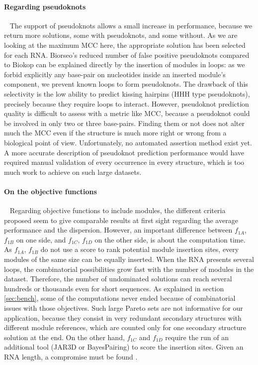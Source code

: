 \documentclass{bioinfo}
\begin{document}
\paragraph{Regarding pseudoknots} ~ The support of pseudoknots allows a small increase in performance, because we return more solutions, some with pseudoknots, and some without. As we are looking at the maximum MCC here, the appropriate solution has been selected for each RNA. 
Biorseo's reduced number of false positive pseudoknots compared to Biokop can be explained directly by the insertion of modules in loops: as we forbid explicitly any base-pair on nucleotides inside an inserted module's component, we prevent known loops to form pseudoknots. The drawback of this selectivity is the low ability to predict kissing hairpins (HHH type pseudoknots), precisely because they require loops to interact.
However, pseudoknot prediction quality is difficult to assess with a metric like MCC, because a pseudoknot could be involved in only two or three base-pairs. Finding them or not does not alter much the MCC even if the structure is much more right or wrong from a biological point of view. Unfortunately, no automated assertion method exist yet.  A more accurate description of pseudoknot prediction performance would have required manual validation of every occurrence in every structure, which is too much work to achieve on such large datasets.

\paragraph{On the objective functions} ~ 
Regarding objective functions to include modules, the different criteria proposed seem to give comparable results at first sight regarding the average performance and the dispersion. However, an important difference between $f_{1A}$, $f_{1B}$ on one side, and $f_{1C}$, $f_{1D}$ on the other side, is about the computation time. As $f_{1A}$, $f_{1B}$ do not use a score to rank potential module insertion sites, every modules of the same size can be equally inserted. When the RNA presents several loops, the combinatorial possibilities grow fast with the number of modules in the dataset. Therefore, the number of undominated solutions can reach several hundreds or thousands even for short sequences. As explained in section \ref{sec:bench}, some of the computations never ended because of combinatorial issues with those objectives. Such large Pareto sets are not informative for our application, because they consist in very redundant secondary structures with different module references, which are counted only for one secondary structure solution at the end. On the other hand, $f_{1C}$ and $f_{1D}$ require the run of an additional tool (JAR3D or BayesPairing) to score the insertion sites. Given an RNA length, a compromise must be found .
\end{document}
